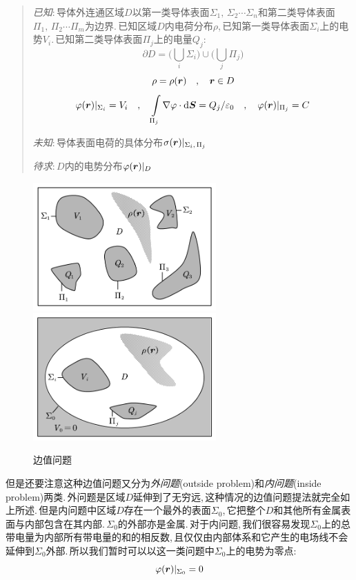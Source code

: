 \begin{verse}
\emph{已知}:\,导体外连通区域$D$以第一类导体表面$\Sigma_1,\,\Sigma_2\cdots\Sigma_n$和第二类导体表面$\Pi_1,\,\Pi_2\cdots\Pi_m$为边界.\,已知区域$D$内电荷分布$\rho$,\,已知第一类导体表面$\Sigma_i$上的电势$V_i$.\,已知第二类导体表面$\Pi_j$上的电量$Q_j$:
\[\partial D=\biggl(\bigcup_i \Sigma_i\biggr)\cup \biggl(\bigcup_j\Pi_j  \biggr) \]
\[\rho=\rho(\boldsymbol{r}) \quad,\quad \boldsymbol{r}\in D\]
\[\varphi(\boldsymbol{r})|_{\Sigma_i}=V_i \quad, \quad \int\limits_{\Pi_j}\nabla\varphi\cdot \textrm{d} \boldsymbol{S}=Q_j/\varepsilon_0 \quad, \quad \varphi(\boldsymbol{r})|_{\Pi_j}=C\]

\emph{未知}:\,导体表面电荷的具体分布$\sigma(\boldsymbol{r})|_{\Sigma_i,\,\Pi_j}$

\emph{待求}:\,$D$内的电势分布$\varphi(\boldsymbol{r})|_{D}$

\end{verse}


\begin{figure}
\vspace{-0.6cm}
\centering
\includegraphics[width=7cm]{image/7-2-4.png}
\includegraphics[width=7cm]{image/7-2-5.png}
\caption{边值问题}
\end{figure}
但是还要注意这种边值问题又分为\emph{外问题}(outside problem)和\emph{内问题}(inside problem)两类.\,外问题是区域$D$延伸到了无穷远,\,这种情况的边值问题提法就完全如上所述.\,但是内问题中区域$D$存在一个最外的表面$\Sigma_0$,\,它把整个$D$和其他所有金属表面与内部包含在其内部.\,$\Sigma_0$的外部亦是金属.\,对于内问题,\,我们很容易发现$\Sigma_0$上的总带电量为内部所有带电量的和的相反数,\,且仅仅由内部体系和它产生的电场线不会延伸到$\Sigma_0$外部.\,所以我们暂时可以以这一类问题中$\Sigma_0$上的电势为零点:
\[\varphi(\boldsymbol{r})|_{\Sigma_0}=0\]

